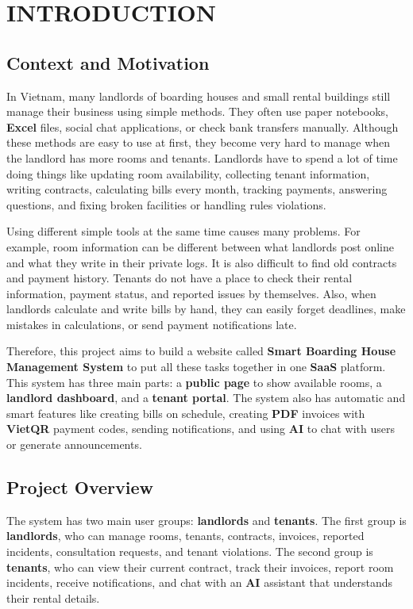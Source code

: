 \chapter{INTRODUCTION}

\section{Context and Motivation}
In Vietnam, many landlords of boarding houses and small rental buildings still manage their business using simple methods. They often use paper notebooks, \textbf{Excel} files, social chat applications, or check bank transfers manually. Although these methods are easy to use at first, they become very hard to manage when the landlord has more rooms and tenants. Landlords have to spend a lot of time doing things like updating room availability, collecting tenant information, writing contracts, calculating bills every month, tracking payments, answering questions, and fixing broken facilities or handling rules violations.

Using different simple tools at the same time causes many problems. For example, room information can be different between what landlords post online and what they write in their private logs. It is also difficult to find old contracts and payment history. Tenants do not have a place to check their rental information, payment status, and reported issues by themselves. Also, when landlords calculate and write bills by hand, they can easily forget deadlines, make mistakes in calculations, or send payment notifications late.

Therefore, this project aims to build a website called \textbf{Smart Boarding House Management System} to put all these tasks together in one \textbf{SaaS} platform. This system has three main parts: a \textbf{public page} to show available rooms, a \textbf{landlord dashboard}, and a \textbf{tenant portal}. The system also has automatic and smart features like creating bills on schedule, creating \textbf{PDF} invoices with \textbf{VietQR} payment codes, sending notifications, and using \textbf{AI} to chat with users or generate announcements.

\section{Project Overview}
The system has two main user groups: \textbf{landlords} and \textbf{tenants}. The first group is \textbf{landlords}, who can manage rooms, tenants, contracts, invoices, reported incidents, consultation requests, and tenant violations. The second group is \textbf{tenants}, who can view their current contract, track their invoices, report room incidents, receive notifications, and chat with an \textbf{AI} assistant that understands their rental details.

